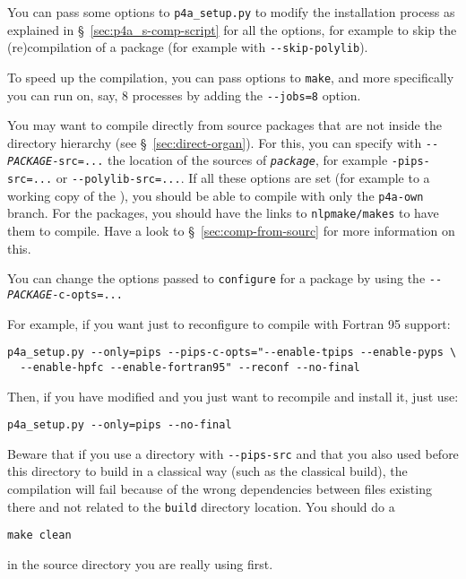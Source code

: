 \documentclass[a4paper]{article}
\begin{document}
You can pass some options to \verb|p4a_setup.py| to modify the
installation process as explained in \S~\ref{sec:p4a_s-comp-script} for
all the options, for example to skip the (re)compilation of a package (for
example with \verb/--skip-polylib/).

To speed up the compilation, you can pass options to \texttt{make}, and more
specifically you can run on, say, 8 processes by adding the
\verb/--jobs=8/ option.

You may want to compile \Apfa directly from source packages that are not
inside the \Apfa directory hierarchy (see \S~\ref{sec:direct-organ}). For
this, you can specify with \texttt{-{}-\emph{PACKAGE}-src=...} the
location of the sources of \texttt{\emph{package}}, for example
\verb|-pips-src=...| or \verb|--polylib-src=...|. If all these options are
set (for example to a working copy of the \Apips{} \Asvn), you should be
able to compile with only the \texttt{p4a-own} branch. For the \Apips
packages, you should have the links to \texttt{nlpmake/makes} to have them
to compile. Have a look to \S~\ref{sec:comp-from-sourc} for more
information on this.

You can change the options passed to \texttt{configure} for a package by
using the \texttt{-{}-\emph{PACKAGE}-c-opts=...}

For example, if you want just to reconfigure to compile \Apips with
Fortran 95 support:
\begin{verbatim}
p4a_setup.py --only=pips --pips-c-opts="--enable-tpips --enable-pyps \
  --enable-hpfc --enable-fortran95" --reconf --no-final
\end{verbatim}

Then, if you have modified \Apips and you just want to recompile and
install it, just use:
\begin{verbatim}
p4a_setup.py --only=pips --no-final
\end{verbatim}

Beware that if you use a \Apips directory with \verb|--pips-src| and that
you also used before this directory to build \Apips in a classical way
(such as the classical \Asvn build), the compilation will fail because of
the wrong dependencies between files existing there and not related to the
\Apfa \texttt{build} directory location. You should do a
\begin{verbatim}
make clean
\end{verbatim}
in the \Apips source directory you are really using first.
\end{document}
